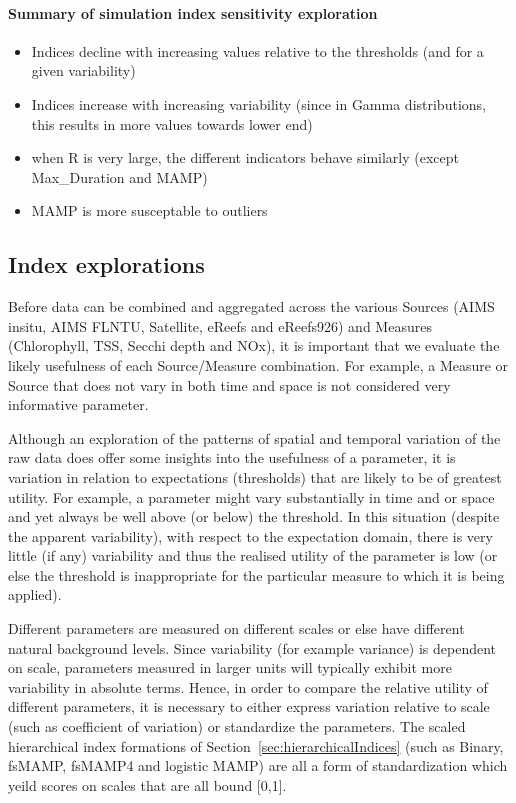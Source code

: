 \clearpage

\paragraph{Summary of simulation index sensitivity exploration}
\begin{itemize}
\item Indices decline with increasing values relative to the thresholds (and for a given
variability)
\item Indices increase with increasing variability (since in Gamma distributions, this results in
more values towards lower end)
\item when R is very large, the different indicators behave similarly (except Max\_Duration and
MAMP)
\item MAMP is more susceptable to outliers
\end{itemize}

\clearpage

\subsection{Index explorations}

Before data can be combined and aggregated across the various Sources (AIMS insitu, AIMS FLNTU,
Satellite, eReefs and eReefs926) and Measures (Chlorophyll, TSS, Secchi depth and NOx), it is
important that we evaluate the likely usefulness of each Source/Measure combination.  For example, a
Measure or Source that does not vary in both time and space is not considered very informative
parameter.

Although an exploration of the patterns of spatial and temporal variation of the raw data does offer
some insights into the usefulness of a parameter, it is variation in relation to expectations
(thresholds) that are likely to be of greatest utility.  For example, a parameter might vary
substantially in time and or space and yet always be well above (or below) the threshold.  In this
situation (despite the apparent variability), with respect to the expectation domain, there is very little
(if any) variability and thus the realised utility of the parameter is low (or else the threshold is
inappropriate for the particular measure to which it is being applied).

Different parameters are measured on different scales or else have different natural background
levels.  Since variability (for example variance) is dependent on scale, parameters measured in
larger units will typically exhibit more variability in absolute terms.  Hence, in order to compare
the relative utility of different parameters, it is necessary to either express variation relative
to scale (such as coefficient of variation) or standardize the parameters.  The scaled hierarchical
index formations of Section~\ref{sec:hierarchicalIndices} (such as Binary, fsMAMP, fsMAMP4 and
logistic MAMP) are all a form of standardization which yeild scores on scales that are all bound [0,1].

